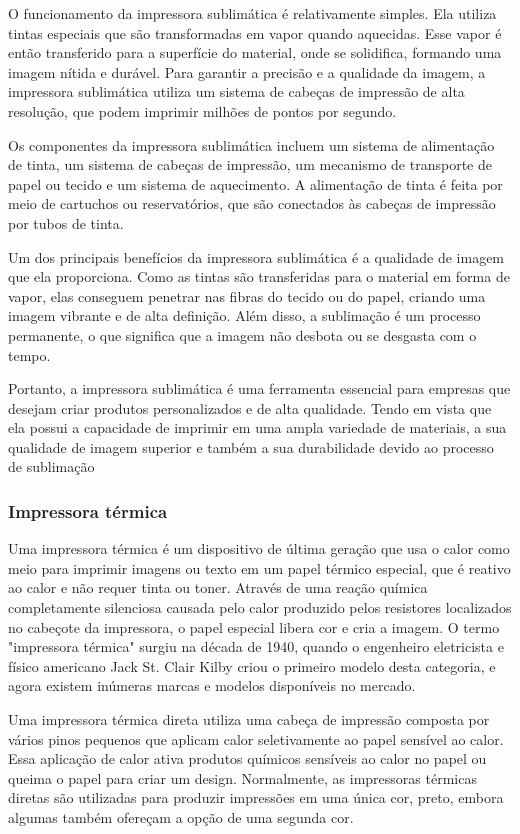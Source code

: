 \documentclass[12pt,a4, oneside, brazil]{article}
\begin{document}
			O funcionamento da impressora sublimática é relativamente simples. Ela utiliza tintas especiais que são transformadas em vapor quando aquecidas. Esse vapor é então transferido para a superfície do material, onde se solidifica, formando uma imagem nítida e durável. Para garantir a precisão e a qualidade da imagem, a impressora sublimática utiliza um sistema de cabeças de impressão de alta resolução, que podem imprimir milhões de pontos por segundo.
			
			Os componentes da impressora sublimática incluem um sistema de alimentação de tinta, um sistema de cabeças de impressão, um mecanismo de transporte de papel ou tecido e um sistema de aquecimento. A alimentação de tinta é feita por meio de cartuchos ou reservatórios, que são conectados às cabeças de impressão por tubos de tinta. 
			
			Um dos principais benefícios da impressora sublimática é a qualidade de imagem que ela proporciona. Como as tintas são transferidas para o material em forma de vapor, elas conseguem penetrar nas fibras do tecido ou do papel, criando uma imagem vibrante e de alta definição. Além disso, a sublimação é um processo permanente, o que significa que a imagem não desbota ou se desgasta com o tempo.
			
			Portanto, a impressora sublimática é uma ferramenta essencial para empresas que desejam criar produtos personalizados e de alta qualidade. Tendo em vista que ela possui a capacidade de imprimir em uma ampla variedade de materiais, a sua qualidade de imagem superior e também a sua durabilidade devido ao processo de sublimação
			
			\subsubsection{Impressora térmica}
			
			Uma impressora térmica é um dispositivo de última geração que usa o calor como meio para imprimir imagens ou texto em um papel térmico especial, que é reativo ao calor e não requer tinta ou toner. Através de uma reação química completamente silenciosa causada pelo calor produzido pelos resistores localizados no cabeçote da impressora, o papel especial libera cor e cria a imagem. O termo "impressora térmica" surgiu na década de 1940, quando o engenheiro eletricista e físico americano Jack St. Clair Kilby criou o primeiro modelo desta categoria, e agora existem inúmeras marcas e modelos disponíveis no mercado.
			
			Uma impressora térmica direta utiliza uma cabeça de impressão composta por vários pinos pequenos que aplicam calor seletivamente ao papel sensível ao calor. Essa aplicação de calor ativa produtos químicos sensíveis ao calor no papel ou queima o papel para criar um design.
			Normalmente, as impressoras térmicas diretas são utilizadas para produzir impressões em uma única cor, preto, embora algumas também ofereçam a opção de uma segunda cor.
			
\end{document}
